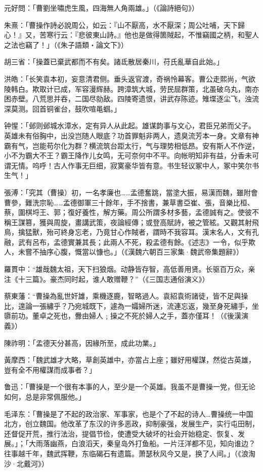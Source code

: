 元好問：「曹劉坐嘯虎生風，四海無人角兩雄。」（《論詩絕句》）

朱熹：「曹操作詩必說周公，如云：『山不厭高，水不厭深；周公吐哺，天下歸心！』又，苦寒行云：『悲彼東山詩。』他也是做得箇賊起，不惟竊國之柄，和聖人之法也竊了！」（《朱子語類‧論文下》）

胡三省：「操蓋已棄武都而不有矣。諸氐散居秦川，苻氏亂華自此始。」

洪皓：「长笑袁本初，妄意清君侧。垂头返官渡，奇祸怜幕客。曹公走熙尚，气欲陵韩白。欺取计已成，军容漫辉赫。跨漳筑大城，劳民屈群策，北虽破乌丸，南亦困赤壁。八荒思并吞，二国尽勍敌。四陵寄遗恨，讲武存陈迹。雉堞逐尘飞，浊流深莫测。回首铜雀台，鼓吹喧黾蝈。」

钟惺：「邺则邺城水漳水，定有异人从此起。雄谋韵事与文心，君臣兄弟而父子。英雄未有俗胸中，出没岂随人眼底？功首罪魁非两人，遗臭流芳本一身。文章有神霸有气，岂能苟尔化为群？横流筑台距太行，气与理势相低昂。安有斯人不作逆，小不为霸大不王？霸王降作儿女鸣，无可奈何中不平。向帐明知非有益，分香未可谓无情。呜呼！古人作事无巨细，寂寞豪华皆有意。书生轻议冢中人，冢中笑尔书生气！」

張溥：「究其（曹操）初，一名孝廉也……孟德奮跳，當塗大振，易漢而魏，雖附會曹參，難洗宗恥……孟德御軍三十餘年，手不捨書，兼草書亞崔、張，音樂比桓、蔡，圍棋埒王、郭；復好養性，解方藥。周公所謂多材多藝，孟德誠有之。使彼不稱王謀篡，獲與周旋，畫講武策，夜論經傳；或登高賦詩，被之管絃。又觀其射飛鳥，擒猛獸，殆可終身忘老，乃竟甘心作賊者，謂時不我容耳。漢末名人，文有孔融，武有呂布，孟德實兼其長；此兩人不死，殺孟德有餘。《述志》一令，似乎欺人，未嘗不抽序心腹，慨當以慷也。」（《漢魏六朝百三家集·魏武帝集題辭》）

羅貫中：“雄哉魏太祖，天下扫狼烟。动静皆存智，高低善用贤。长驱百万众，亲注《十三篇》。豪杰同时起，谁人敢赠鞭？”（《三国志通俗演义》）

蔡東藩：“曹操為亂世奸雄，乘機逐鹿，智略過人。袁紹袁術諸徒，皆不足與操比，遑論一張繡乎？乃宛城既下，遽為一孀婦所迷，流連忘返，幾至身死繡手，坐隳前功。董卓之死也，釁由婦人﹔操之不死於婦人之手，蓋亦僅耳！（《後漢演義》）

陳祚明：「孟德天分甚高，因緣所至，成此功業。」

黃摩西：「魏武雄才大略，草創英雄中，亦當占上座；雖好用權謀，然從古英雄，豈有全不用權謀而成事者？」

鲁迅：「曹操是一个很有本事的人，至少是一个英雄。我虽不是曹操一党，但无论如何，总是非常佩服他。」

毛泽东：「曹操是了不起的政治家、军事家，也是个了不起的诗人…曹操统一中国北方，创立魏国。他改革了东汉的许多恶政，抑制豪强，发展生产，实行屯田制，还督促开荒，推行法治，提倡节俭，使遭受大破坏的社会开始稳定、恢复、发展。」；「大雨落幽燕，白浪滔天，秦皇岛外打鱼船。一片汪洋都不见，知向谁边？往事越千年，魏武挥鞭，东临碣石有遗篇。萧瑟秋风今又是，换了人间。」（《浪淘沙·北戴河》）

